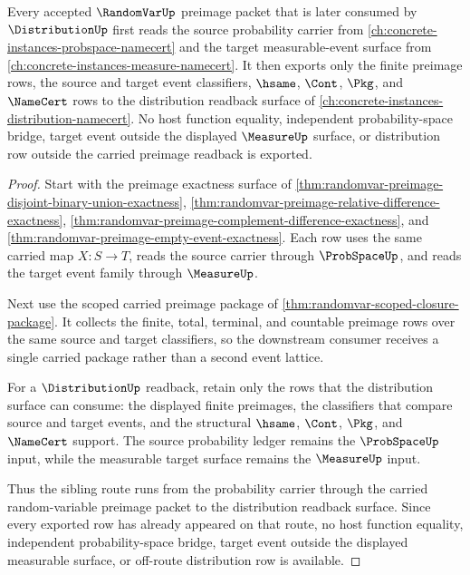 \begin{theorem}
\label{thm:random-var-probspace-distribution-sibling-route}
Every accepted $\RandomVarUp$ preimage packet that is later consumed by $\DistributionUp$ first reads the source probability carrier from \autoref{ch:concrete-instances-probspace-namecert} and the target measurable-event surface from \autoref{ch:concrete-instances-measure-namecert}. It then exports only the finite preimage rows, the source and target event classifiers, $\hsame$, $\Cont$, $\Pkg$, and $\NameCert$ rows to the distribution readback surface of \autoref{ch:concrete-instances-distribution-namecert}. No host function equality, independent probability-space bridge, target event outside the displayed $\MeasureUp$ surface, or distribution row outside the carried preimage readback is exported.
\end{theorem}
\begin{proof}
Start with the preimage exactness surface of \autoref{thm:randomvar-preimage-disjoint-binary-union-exactness}, \autoref{thm:randomvar-preimage-relative-difference-exactness}, \autoref{thm:randomvar-preimage-complement-difference-exactness}, and \autoref{thm:randomvar-preimage-empty-event-exactness}. Each row uses the same carried map $X:S\to T$, reads the source carrier through $\ProbSpaceUp$, and reads the target event family through $\MeasureUp$.

Next use the scoped carried preimage package of \autoref{thm:randomvar-scoped-closure-package}. It collects the finite, total, terminal, and countable preimage rows over the same source and target classifiers, so the downstream consumer receives a single carried package rather than a second event lattice.

For a $\DistributionUp$ readback, retain only the rows that the distribution surface can consume: the displayed finite preimages, the classifiers that compare source and target events, and the structural $\hsame$, $\Cont$, $\Pkg$, and $\NameCert$ support. The source probability ledger remains the $\ProbSpaceUp$ input, while the measurable target surface remains the $\MeasureUp$ input.

Thus the sibling route runs from the probability carrier through the carried random-variable preimage packet to the distribution readback surface. Since every exported row has already appeared on that route, no host function equality, independent probability-space bridge, target event outside the displayed measurable surface, or off-route distribution row is available.
\end{proof}
